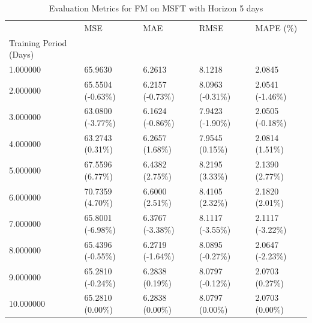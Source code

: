 \begin{table}
\caption{Evaluation Metrics for FM on MSFT with Horizon 5 days}
\label{tab:fm_MSFT_h5_metrics}
\begin{tabular}{lllll}
\toprule
 & MSE & MAE & RMSE & MAPE (\%) \\
Training Period (Days) &  &  &  &  \\
\midrule
1.000000 & 65.9630 & 6.2613 & 8.1218 & 2.0845 \\
2.000000 & 65.5504 (-0.63\%) & 6.2157 (-0.73\%) & 8.0963 (-0.31\%) & 2.0541 (-1.46\%) \\
3.000000 & 63.0800 (-3.77\%) & 6.1624 (-0.86\%) & 7.9423 (-1.90\%) & 2.0505 (-0.18\%) \\
4.000000 & 63.2743 (0.31\%) & 6.2657 (1.68\%) & 7.9545 (0.15\%) & 2.0814 (1.51\%) \\
5.000000 & 67.5596 (6.77\%) & 6.4382 (2.75\%) & 8.2195 (3.33\%) & 2.1390 (2.77\%) \\
6.000000 & 70.7359 (4.70\%) & 6.6000 (2.51\%) & 8.4105 (2.32\%) & 2.1820 (2.01\%) \\
7.000000 & 65.8001 (-6.98\%) & 6.3767 (-3.38\%) & 8.1117 (-3.55\%) & 2.1117 (-3.22\%) \\
8.000000 & 65.4396 (-0.55\%) & 6.2719 (-1.64\%) & 8.0895 (-0.27\%) & 2.0647 (-2.23\%) \\
9.000000 & 65.2810 (-0.24\%) & 6.2838 (0.19\%) & 8.0797 (-0.12\%) & 2.0703 (0.27\%) \\
10.000000 & 65.2810 (0.00\%) & 6.2838 (0.00\%) & 8.0797 (0.00\%) & 2.0703 (0.00\%) \\
\bottomrule
\end{tabular}
\end{table}
